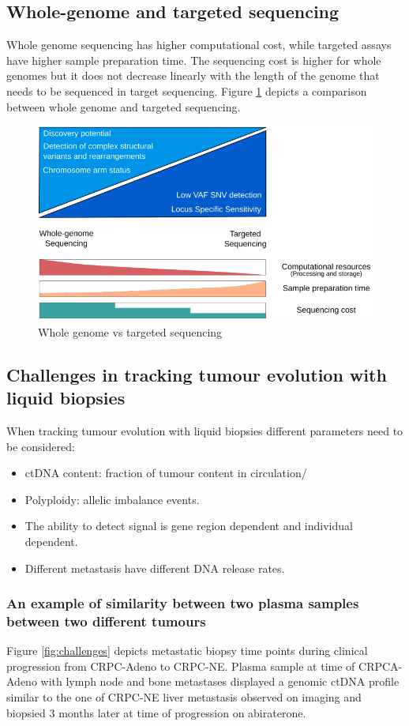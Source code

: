     \subsection{Whole-genome and targeted sequencing}
    Whole genome sequencing has higher computational cost, while targeted assays have higher sample preparation time.
    The sequencing cost is higher for whole genomes but it does not decrease linearly with the length of the genome that needs to be sequenced in target sequencing.
    Figure \ref{fig:wg} depicts a comparison between whole genome and targeted sequencing.

    \begin{figure}[H]
        \centering
        \includegraphics[width=0.6\linewidth]{wg.png}
        \caption{\label{fig:wg}Whole genome vs targeted sequencing}
    \end{figure}

    \subsection{Challenges in tracking tumour evolution with liquid biopsies}
    When tracking tumour evolution with liquid biopsies different parameters need to be considered:

    \begin{multicols}{2}
        \begin{itemize}
            \item ctDNA content: fraction of tumour content in circulation/
            \item Polyploidy: allelic imbalance events.
            \item The ability to detect signal is gene region dependent and individual dependent.
            \item Different metastasis have different DNA release rates.
        \end{itemize}
    \end{multicols}


        \subsubsection{An example of similarity between two plasma samples between two different tumours}
        Figure \ref{fig:challenges} depicts metastatic biopsy time points during clinical progression from CRPC-Adeno to CRPC-NE.
        Plasma sample at time of CRPCA-Adeno with lymph node and bone metastases displayed a genomic ctDNA profile similar to the one of CRPC-NE liver metastasis observed on imaging and biopsied $3$ months later at time of progression on abiraterone.

